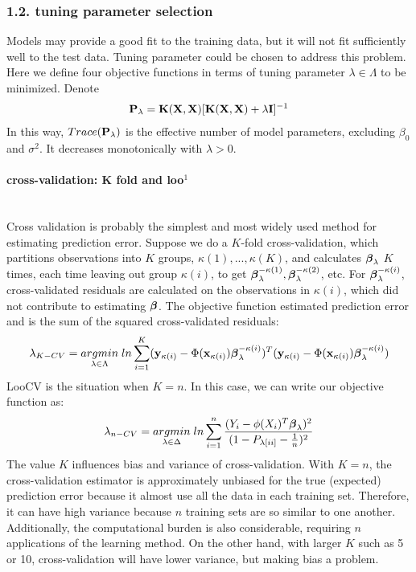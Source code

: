 \documentclass[11pt]{article}
\begin{document}
\setcounter{equation}{0}
\renewcommand{\theequation}{1.2.\arabic{equation}}
\subsubsection*{{1.2. tuning parameter selection}}
Models may provide a good fit to the training data, but it will not fit sufficiently well to the test data. Tuning parameter could be chosen to address this problem. Here we define four objective functions in terms of tuning parameter $\lambda \in \Lambda$ to be minimized. Denote
\begin{align}
{\bf P}_\lambda={\bf K}({\bf X}, {\bf X})[{\bf K}({\bf X}, {\bf X})+\lambda {\bf I}]^{-1}
\end{align}
In this way, $Trace({\bf P}_\lambda)$ is the effective number of model parameters, excluding $\beta_0$ and $\sigma^2$. It decreases monotonically with $\lambda>0$. 

\paragraph{cross-validation: K fold and loo$^{1}$}\mbox{}\\
Cross validation is probably the simplest and most widely used method for estimating prediction error. Suppose we do a $K$-fold cross-validation, which partitions observations into $K$ groups, $\kappa(1),...,\kappa(K)$, and calculates $\boldsymbol{\beta}_\lambda$ $K$ times, each time leaving out group $\kappa(i)$, to get $\boldsymbol{\beta}_\lambda^{-\kappa(1)}, \boldsymbol{\beta}_\lambda^{-\kappa(2)}$, etc. For $\boldsymbol{\beta}_\lambda^{-\kappa(i)}$, cross-validated residuals are calculated on the observations in $\kappa(i)$, which did not contribute to estimating $\boldsymbol{\beta}$. The objective function estimated prediction error and is the sum of the squared cross-validated residuals:
\begin{align}
\lambda_{K-CV}=\underset{\lambda \in \Lambda}{argmin}\;ln\sum_{i=1}^K({\bf y}_{\kappa(i)}-\Phi({\bf x}_{\kappa(i)})\boldsymbol{\beta}_\lambda^{-\kappa(i)})^T({\bf y}_{\kappa(i)}-\Phi({\bf x}_{\kappa(i)})\boldsymbol{\beta}_\lambda^{-\kappa(i)})
\end{align}
LooCV is the situation when $K=n$. In this case, we can write our objective function as:
\begin{align}
\lambda_{n-CV}=\underset{\lambda \in \Delta}{argmin}\;ln\sum_{i=1}^n \frac{(Y_i-\phi(X_i)^T\boldsymbol{\beta}_\lambda)^2}{(1-P_{\lambda[ii]}-\frac{1}{n})^2}
\end{align}
The value $K$ influences bias and variance of cross-validation. With $K=n$, the cross-validation estimator is approximately unbiased for the true (expected) prediction error because it almost use all the data in each training set. Therefore, it can have high variance because $n$ training sets are so similar to one another. Additionally, the computational burden is also considerable, requiring $n$ applications of the learning method. On the other hand, with larger $K$ such as 5 or 10, cross-validation will have lower variance, but making bias a problem.
\end{document}
